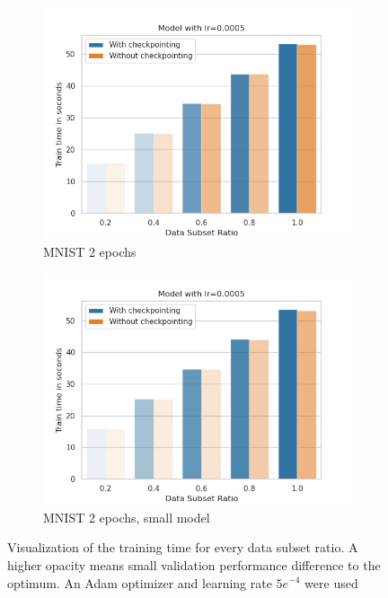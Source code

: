 \begin{figure}[h]
\begin{subfigure}[b]{0.24\textwidth}
        \centering
        \includegraphics[width=\textwidth]{figures/22_07/2ep/train_subset_0.0005.png}
        \caption{MNIST 2 epochs}
        \label{fig:8c}
    \end{subfigure}
    \begin{subfigure}[b]{0.24\textwidth}
        \centering
        \includegraphics[width=\textwidth]{figures/22_07/2ep_smaller/train_subset_0.0005.png}
        \caption{MNIST 2 epochs, small model}
        \label{fig:8d}
    \end{subfigure}
    \caption{Visualization of the training time for every data subset ratio. A higher opacity means small validation performance difference to the optimum. An Adam optimizer and learning rate $5e^{-4}$ were used}
    \label{fig:8}
\end{figure}

